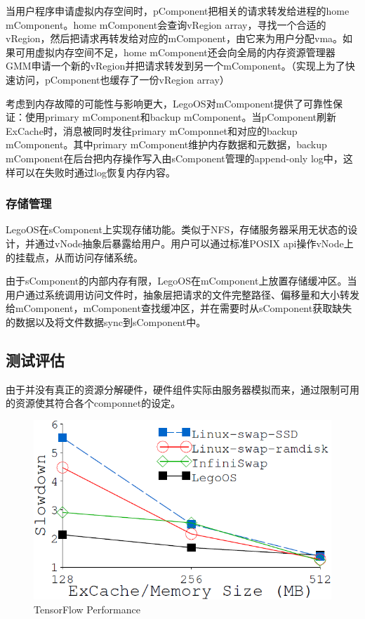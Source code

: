 当用户程序申请虚拟内存空间时，pComponent把相关的请求转发给进程的home mComponent。home mComponent会查询vRegion array，寻找一个合适的vRegion，然后把请求再转发给对应的mComponent，由它来为用户分配vma。如果可用虚拟内存空间不足，home mComponent还会向全局的内存资源管理器GMM申请一个新的vRegion并把请求转发到另一个mComponent。（实现上为了快速访问，pComponent也缓存了一份vRegion array）

考虑到内存故障的可能性与影响更大，LegoOS对mComponent提供了可靠性保证：使用primary mComponent和backup mComponent。当pComponent刷新ExCache时，消息被同时发往primary mComponnet和对应的backup mComponent。其中primary mComponent维护内存数据和元数据，backup mComponent在后台把内存操作写入由sComponent管理的append-only log中，这样可以在失败时通过log恢复内存内容。

\subsubsection{存储管理}

LegoOS在sComponent上实现存储功能。类似于NFS，存储服务器采用无状态的设计，并通过vNode抽象后暴露给用户。用户可以通过标准POSIX api操作vNode上的挂载点，从而访问存储系统。

由于sComponent的内部内存有限，LegoOS在mComponent上放置存储缓冲区。当用户通过系统调用访问文件时，抽象层把请求的文件完整路径、偏移量和大小转发给mComponent，mComponent查找缓冲区，并在需要时从sComponent获取缺失的数据以及将文件数据sync到sComponent中。

\subsection{测试评估}

由于并没有真正的资源分解硬件，硬件组件实际由服务器模拟而来，通过限制可用的资源使其符合各个componnet的设定。

\begin{figure}[h]
\centering
\includegraphics[scale=0.50]{Figures/legoos/tensorflow_perf.png}
\decoRule
\caption{TensorFlow Performance}
\label{fig:tensorflow_perf}
\end{figure}

